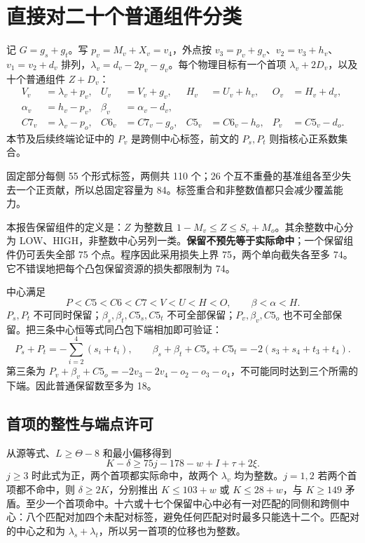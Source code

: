 \documentclass[11pt,a4paper]{article}
\begin{document}
\hypertarget{ux76f4ux63a5ux5bf9ux4e8cux5341ux4e2aux666eux901aux7ec4ux4ef6ux5206ux7c7b}{%
\section{直接对二十个普通组件分类}\label{ux76f4ux63a5ux5bf9ux4e8cux5341ux4e2aux666eux901aux7ec4ux4ef6ux5206ux7c7b}}

记 \(G=g_s+g_t\)。写 \(p_v=M_v+X_v=v_4\)，外点按
\(v_3=p_v+g_v\)、\(v_2=v_3+h_v\)、\(v_1=v_2+d_v\)
排列，\(\lambda_v=d_v-2p_v-g_v\)。每个物理目标有一个首项
\(\lambda_v+2D_v\)，以及十个普通组件 \(Z+D_v\)： \[
 \begin{aligned}
 V_v&=\lambda_v+p_v,&U_v&=V_v+g_v,&H_v&=U_v+h_v,&O_v&=H_v+d_v,\\
 \alpha_v&=h_v-p_v,&\beta_v&=\alpha_v-d_v,\\
 C7_v&=\lambda_v-p_o,&C6_v&=C7_v-g_o,&C5_v&=C6_v-h_o,&P_v&=C5_v-d_o.
 \end{aligned}
\] 本节及后续终端论证中的 \(P_v\) 是跨侧中心标签，前文的 \(P_s,P_t\)
则指核心正系数集合。

固定部分每侧 55 个形式标签，两侧共 110 个；26
个互不重叠的基准组各至少失去一个正贡献，所以总固定容量为
84。标签重合和非整数值都只会减少覆盖能力。

本报告保留组件的定义是：\(Z\) 为整数且
\(1-M_v\le Z\le S_v+M_o\)。其余整数中心分为
LOW、HIGH，非整数中心另列一类。\textbf{保留不预先等于实际命中}；一个保留组件仍可丢失全部
75 个点。程序因此采用损失上界 75，两个单向截失各至多
74。它不错误地把每个凸包保留资源的损失都限制为 74。

中心满足 \[
 P<C5<C6<C7<V<U<H<O,\qquad \beta<\alpha<H.
\] \(P_s,P_t\) 不可同时保留；\(\beta_s,\beta_t,C5_s,C5_t\)
不可全部保留；\(P_v,\beta_v,C5_o\)
也不可全部保留。把三条中心恒等式同凸包下端相加即可验证： \[
 P_s+P_t=-\sum_{i=2}^4(s_i+t_i),\qquad
 \beta_s+\beta_t+C5_s+C5_t=-2(s_3+s_4+t_3+t_4).
\] 第三条为
\(P_v+\beta_v+C5_o=-2v_3-2v_4-o_2-o_3-o_4\)，不可能同时达到三个所需的下端。因此普通保留数至多为
18。

\hypertarget{ux9996ux9879ux7684ux6574ux6027ux4e0eux7aefux70b9ux8bb8ux53ef}{%
\subsection{首项的整性与端点许可}\label{ux9996ux9879ux7684ux6574ux6027ux4e0eux7aefux70b9ux8bb8ux53ef}}

从源等式、\(L\ge\Theta-8\) 和最小偏移得到 \[
 K-\delta\ge75j-178-w+I+\tau+2\xi.
\] \(j\ge3\) 时此式为正，两个首项都实际命中，故两个 \(\lambda_v\)
均为整数。\(j=1,2\) 若两个首项都不命中，则 \(\delta\ge2K\)，分别推出
\(K\le103+w\) 或 \(K\le28+w\)，与 \(K\ge149\)
矛盾。至少一个首项命中。十六或十七个保留中心中必有一对匹配的同侧和跨侧中心：八个匹配对加四个未配对标签，避免任何匹配对时最多只能选十二个。匹配对的中心之和为
\(\lambda_s+\lambda_t\)，所以另一首项的位移也为整数。
\end{document}

